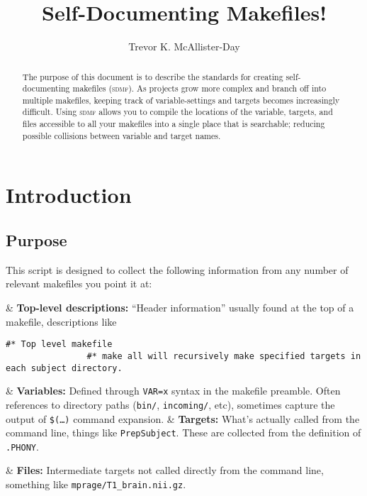 \documentclass[oneside,11pt]{article}
\title{Self-Documenting Makefiles!}
\author{Trevor K. McAllister-Day}
\affil{\url{tkmday@uw.edu}}
\newcommand{\sdmf}{\textsc{sdmf}}
\begin{document}
	
	\maketitle
	
	
	\begin{abstract}
		The purpose of this document is to describe the standards for creating self-documenting makefiles (\sdmf). As projects grow more complex and branch off into multiple makefiles, keeping track of variable-settings and targets becomes increasingly difficult. Using \sdmf{} allows you to compile the locations of the variable, targets, and files accessible to all your makefiles into a single place that is searchable; reducing possible collisions between variable and target names.
	\end{abstract}
	
	\section{Introduction}
	
	\subsection{Purpose}
	
	This script is designed to collect the following information from any number of relevant makefiles you point it at:
	
	\begin{easylist}[itemize]
		& \textbf{Top-level descriptions:} ``Header information'' usually found at the top of a makefile, descriptions like
			\begin{lstlisting}[basicstyle=\ttfamily, gobble=24, breaklines=true]
				#* Top level makefile
				#* make all will recursively make specified targets in each subject directory.
			\end{lstlisting}
		& \textbf{Variables:} Defined through \texttt{VAR=x} syntax in the makefile preamble. Often references to directory paths (\texttt{bin/}, \texttt{incoming/}, etc), sometimes capture the output of \texttt{\$(\ldots)} command expansion.
		& \textbf{Targets:} What's actually called from the command line, things like \texttt{PrepSubject}. These are collected from the definition of \texttt{.PHONY}. 
			\begin{center}
			\end{center}
		& \textbf{Files:} Intermediate targets not called directly from the command line, something like \texttt{mprage/T1\_brain.nii.gz}.
	\end{easylist}
	
\end{document}

